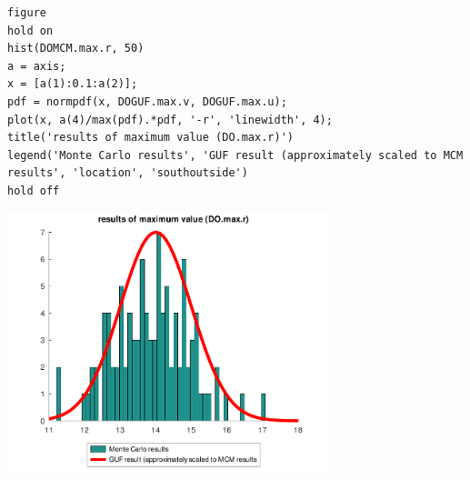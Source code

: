 \begin{lstlisting}
figure
hold on
hist(DOMCM.max.r, 50)
a = axis;
x = [a(1):0.1:a(2)];
pdf = normpdf(x, DOGUF.max.v, DOGUF.max.u);
plot(x, a(4)/max(pdf).*pdf, '-r', 'linewidth', 4);
title('results of maximum value (DO.max.r)')
legend('Monte Carlo results', 'GUF result (approximately scaled to MCM results', 'location', 'southoutside')
hold off
\end{lstlisting}
\begin{center}
\includegraphics[width=0.7\textwidth]{algs_examples_published/testGM_alg_example-2.pdf}
\end{center}


\stopcontents[localtoc]
